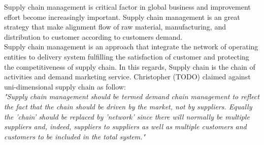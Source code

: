 Supply chain management is critical factor in global business and improvement effort become increasingly important. Supply chain management is an great strategy that make alignment flow of raw material, manufacturing, and distribution to customer according to customers demand. \\
Supply chain management is an approach that integrate the network of operating entities to delivery system fulfilling the satisfaction of customer and protecting the competitiveness of supply chain. 
In this regards, Supply chain is the chain of activities and demand marketing service\cite{Kemal}. Christopher (TODO) claimed against uni-dimensional supply chain as follow:\\
\textit{"Supply chain management should be termed demand chain management to reflect the fact that the
chain should be driven by the market, not by suppliers. Equally the 'chain' should be replaced by
'network' since there will normally be multiple suppliers and, indeed, suppliers to suppliers as well as
multiple customers and customers to be included in the total system."}
